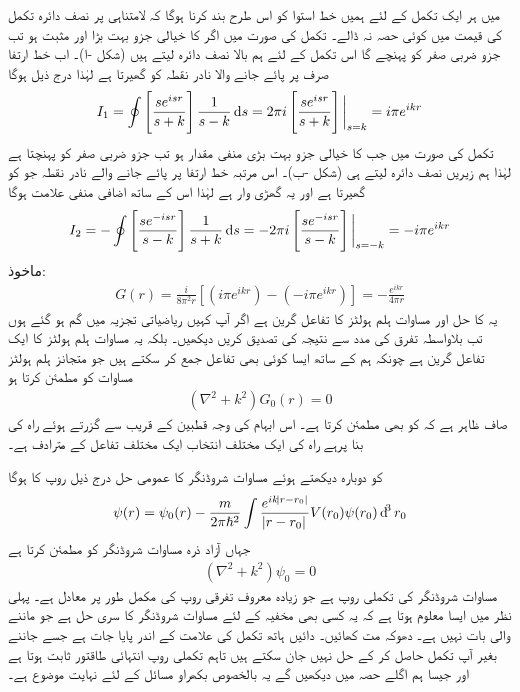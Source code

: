  میں ہر ایک تکمل کے لئے ہمیں خط استوا کو اس طرح بند کرنا ہوگا  کہ لامتناہی پر نصف دائرہ تکمل کی قیمت میں کوئی حصہ نہ ڈالے۔ تکمل  کی صورت میں اگر  کا خیالی جزو بہت بڑا اور مثبت ہو تب جزو ضربی  صفر کو پہنچے گا اس تکمل کے لئے ہم بالا نصف دائرہ لیتے ہیں (شکل -ا)۔ اب خط ارتفا صرف  پر پائے جانے والا نادر نقطہ کو گھیرتا ہے لہٰذا درج ذیل ہوگا
\begin{align}\label{مساوات_بکھراو_آئی_الف}
	I_1 = \oint\left[\frac{se^{isr}}{s+k}\right]\frac{1}{s-k}\dif s = 2\pi i\left[\frac{se^{isr}}{s+k}\right]\bigg|_{s=k} = i\pi e^{ikr}
\end{align}
تکمل  کی صورت میں جب  کا خیالی جزو بہت بڑی منفی مقدار ہو تب جزو ضربی  صفر کو پہنچتا ہے لہٰذا ہم زیریں نصف
 دائرہ لیتے ہی (شکل -ب)۔ اس مرتبہ خط ارتفا  پر پائے جانے والے نادر نقطہ جو کو گھیرتا ہے اور یہ گھڑی وار ہے لہٰذا اس کے ساتھ اضافی منفی علامت ہوگا
\begin{align}\label{مساوات_بکھراو_آئی_ب}
	I_2 = -\oint\left[\frac{se^{-isr}}{s-k}\right]\frac{1}{s+k}\dif s = -2\pi i\left[\frac{se^{-isr}}{s-k}\right]\bigg|_{s=-k} = -i\pi e^{ikr}
\end{align}
ماخوذ:
\begin{align}
	G(r) = \frac{i}{8\pi^2r}\left[\left(i\pi e^{ikr}\right)-\left(-i\pi e^{ikr}\right)\right] = -\frac{e^{ikr}}{4\pi r}
\end{align}
یہ  کا حل اور مساوات ہلم ہولٹز کا تفاعل گرین ہے اگر آپ کہیں ریاضیاتی تجزیہ میں گم  ہو گئے ہوں تب بلاواسطہ تفرق کی مدد سے نتیجہ کی تصدیق کریں  دیکھیں۔ بلکہ یہ مساوات ہلم ہولٹز کا ایک تفاعل گرین ہے چونکہ ہم  کے ساتھ ایسا کوئی بھی تفاعل  جمع کر سکتے ہیں جو متجانز ہلم ہولٹز مساوات کو مطمئن کرتا ہو
\begin{align}
	(\nabla^2+k^2)G_0(r) = 0
\end{align}
صاف ظاہر ہے کہ  کو  بھی مطمئن کرتا ہے۔ اس ابہام کی وجہ قطبین کے قریب سے گزرتے ہوئے راہ کی بنا پرہے راہ کی ایک مختلف انتخاب ایک مختلف تفاعل  کے مترادف ہے۔

 کو دوبارہ دیکھتے ہوئے مساوات شروڈنگر کا عمومی حل درج ذیل روپ کا ہوگا
\begin{align}
	\psi(r) = \psi_0(r)-\frac{m}{2\pi\hslash^2}\int\frac{e^{ik\abs{r-r_0}}}{\abs{r-r_0}}V(r_0)\psi(r_0)\dif^3r_0
\end{align}
جہاں  آزاد ذرہ مساوات شروڈنگر کو مطمئن کرتا ہے
\begin{align}
	(\nabla^2+k^2)\psi_0 = 0
\end{align}
 مساوات شروڈنگر کی تکملی روپ ہے جو زیادہ معروف تفرقی روپ کی مکمل طور پر معادل ہے۔ پہلی نظر میں ایسا معلوم ہوتا ہے کہ یہ کسی بھی مخفیہ کے لئے مساوات شروڈنگر کا سری حل ہے جو ماننے والی بات نہیں ہے۔ دھوکہ مت کھائیں۔ دائیں ہاتھ تکمل کی علامت کے اندر  پایا جات ہے جسے جاننے بغیر آپ تکمل حاصل کر کے حل نہیں جان سکتے ہیں  تاہم تکملی روپ انتہائی طاقتور ثابت ہوتا ہے اور جیسا ہم اگلے حصہ میں دیکھیں گے یہ بالخصوص بکھراو مسائل کے لئے نہایت موضوع ہے۔

